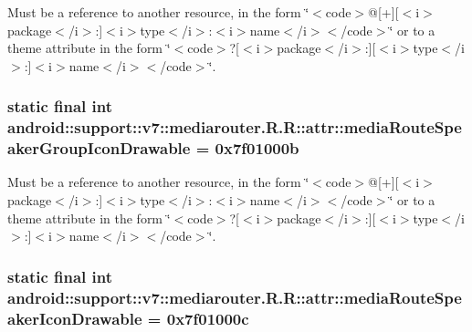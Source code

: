 Must be a reference to another resource, in the form \char`\"{}$<$code$>$@\mbox{[}+\mbox{]}\mbox{[}$<$i$>$package$<$/i$>$:\mbox{]}$<$i$>$type$<$/i$>$:$<$i$>$name$<$/i$>$$<$/code$>$\char`\"{} or to a theme attribute in the form \char`\"{}$<$code$>$?\mbox{[}$<$i$>$package$<$/i$>$:\mbox{]}\mbox{[}$<$i$>$type$<$/i$>$:\mbox{]}$<$i$>$name$<$/i$>$$<$/code$>$\char`\"{}. \hypertarget{classandroid_1_1support_1_1v7_1_1mediarouter_1_1_r_1_1attr_9cfd1efdcc7a12717fe62e04b173128a}{
\subsubsection[{mediaRouteSpeakerGroupIconDrawable}]{\setlength{\rightskip}{0pt plus 5cm}static final int android::support::v7::mediarouter.R.R::attr::mediaRouteSpeakerGroupIconDrawable = 0x7f01000b}}
\label{classandroid_1_1support_1_1v7_1_1mediarouter_1_1_r_1_1attr_9cfd1efdcc7a12717fe62e04b173128a}


Must be a reference to another resource, in the form \char`\"{}$<$code$>$@\mbox{[}+\mbox{]}\mbox{[}$<$i$>$package$<$/i$>$:\mbox{]}$<$i$>$type$<$/i$>$:$<$i$>$name$<$/i$>$$<$/code$>$\char`\"{} or to a theme attribute in the form \char`\"{}$<$code$>$?\mbox{[}$<$i$>$package$<$/i$>$:\mbox{]}\mbox{[}$<$i$>$type$<$/i$>$:\mbox{]}$<$i$>$name$<$/i$>$$<$/code$>$\char`\"{}. \hypertarget{classandroid_1_1support_1_1v7_1_1mediarouter_1_1_r_1_1attr_f1e079f8bc2276df9df92191ea29ac3d}{
\subsubsection[{mediaRouteSpeakerIconDrawable}]{\setlength{\rightskip}{0pt plus 5cm}static final int android::support::v7::mediarouter.R.R::attr::mediaRouteSpeakerIconDrawable = 0x7f01000c}}
\label{classandroid_1_1support_1_1v7_1_1mediarouter_1_1_r_1_1attr_f1e079f8bc2276df9df92191ea29ac3d}


